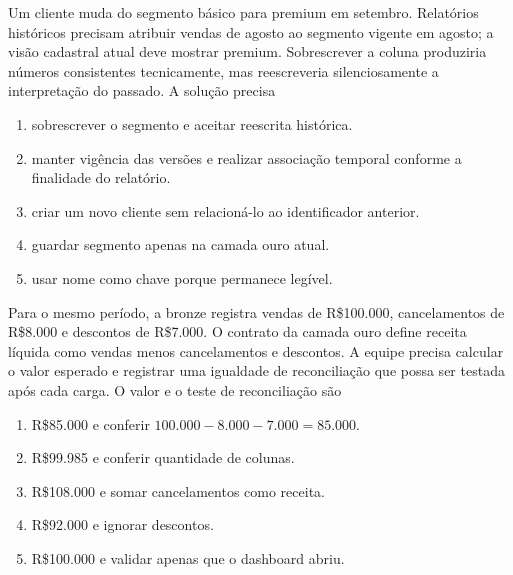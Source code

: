 \TextoBase Um cliente muda do segmento básico para premium em setembro. Relatórios históricos precisam atribuir vendas de agosto ao segmento vigente em agosto; a visão cadastral atual deve mostrar premium. Sobrescrever a coluna produziria números consistentes tecnicamente, mas reescreveria silenciosamente a interpretação do passado.
\FonteDidatica
\Comando A solução precisa
\begin{enumerate}[label=\Alph*)]\item sobrescrever o segmento e aceitar reescrita histórica.\item manter vigência das versões e realizar associação temporal conforme a finalidade do relatório.\item criar um novo cliente sem relacioná-lo ao identificador anterior.\item guardar segmento apenas na camada ouro atual.\item usar nome como chave porque permanece legível.
\end{enumerate}

\TextoBase Para o mesmo período, a bronze registra vendas de R\$100.000, cancelamentos de R\$8.000 e descontos de R\$7.000. O contrato da camada ouro define receita líquida como vendas menos cancelamentos e descontos. A equipe precisa calcular o valor esperado e registrar uma igualdade de reconciliação que possa ser testada após cada carga.
\FonteDidatica
\Comando O valor e o teste de reconciliação são
\begin{enumerate}[label=\Alph*)]\item R\$85.000 e conferir $100.000-8.000-7.000=85.000$.\item R\$99.985 e conferir quantidade de colunas.\item R\$108.000 e somar cancelamentos como receita.\item R\$92.000 e ignorar descontos.\item R\$100.000 e validar apenas que o dashboard abriu.
\end{enumerate}

